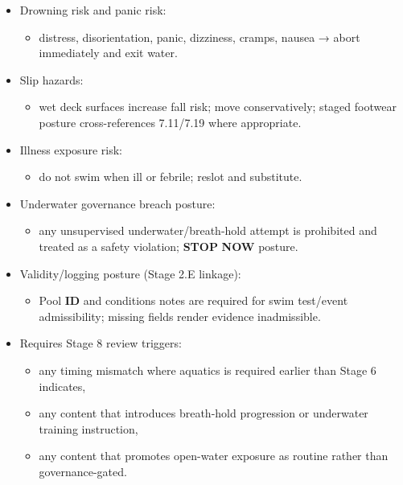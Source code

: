 \documentclass[10pt]{article}
\begin{document}
\begin{itemize}
\item Drowning risk and panic risk:
  \begin{itemize}
  \item distress, disorientation, panic, dizziness, cramps, nausea → abort immediately and exit water.
  \end{itemize}
\item Slip hazards:
  \begin{itemize}
  \item wet deck surfaces increase fall risk; move conservatively; staged footwear posture cross-references 7.11/7.19 where appropriate.
  \end{itemize}
\item Illness exposure risk:
  \begin{itemize}
  \item do not swim when ill or febrile; reslot and substitute.
  \end{itemize}
\item Underwater governance breach posture:
  \begin{itemize}
  \item any unsupervised underwater/breath-hold attempt is prohibited and treated as a safety violation; \textbf{STOP} \textbf{NOW} posture.
  \end{itemize}
\item Validity/logging posture (Stage 2.E linkage):
  \begin{itemize}
  \item Pool \textbf{ID} and conditions notes are required for swim test/event admissibility; missing fields render evidence inadmissible.
  \end{itemize}
\item Requires Stage 8 review triggers:
  \begin{itemize}
  \item any timing mismatch where aquatics is required earlier than Stage 6 indicates,
  \item any content that introduces breath-hold progression or underwater training instruction,
  \item any content that promotes open-water exposure as routine rather than governance-gated.
  \end{itemize}
\end{itemize}
\end{document}
